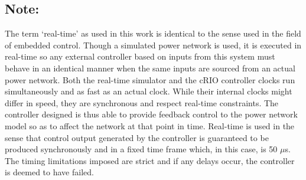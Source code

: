 \documentclass[a4paper, 10 pt, conference]{IEEEtran}
\begin{document}
\IEEEpubidadjcol
\subsection*{Note:}
The term `real-time' as used in this work is identical to the sense used in the field of embedded control\cite{Real-Time}. Though a simulated power network is used, it is executed in real-time so any external controller based on inputs from this system must behave in an identical manner when the same inputs are sourced from an actual power network. Both the real-time simulator and the cRIO controller clocks run simultaneously and as fast as an actual clock. While their internal clocks might differ in speed, they are synchronous and respect real-time constraints. The controller designed is thus able to provide feedback control to the power network model so as to affect the network at that point in time. Real-time is used in the sense that control output generated by the controller is guaranteed to be produced synchronously and in a fixed time frame which, in this case, is 50 $\mu$s. The timing limitations imposed are strict and if any delays occur, the controller is deemed to have failed. 



\end{document}
